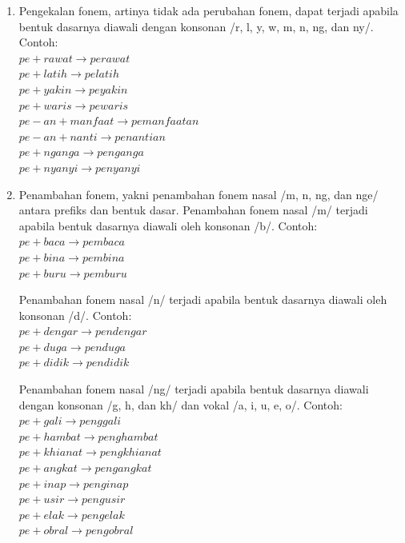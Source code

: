 \begin{enumerate}

	\item Pengekalan fonem, artinya tidak ada perubahan fonem, dapat terjadi apabila bentuk dasarnya diawali dengan konsonan /r, l, y, w, m, n, ng, dan ny/. Contoh:\\
	$pe + rawat \rightarrow perawat$\\	
	$pe + latih \rightarrow pelatih$\\
	$pe + yakin \rightarrow peyakin$\\
	$pe + waris \rightarrow pewaris$\\
	$pe-an + manfaat \rightarrow pemanfaatan$\\
	$pe-an + nanti \rightarrow penantian$\\
	$pe + nganga \rightarrow penganga$\\
	$pe + nyanyi \rightarrow penyanyi$
	
	\item Penambahan fonem, yakni penambahan fonem nasal /m, n, ng, dan nge/ antara prefiks dan bentuk dasar. Penambahan fonem nasal /m/ terjadi apabila bentuk dasarnya diawali oleh konsonan /b/. Contoh:\\
	$pe + baca \rightarrow pembaca$\\
	$pe + bina \rightarrow pembina$\\
	$pe + buru \rightarrow pemburu$
	
	Penambahan fonem nasal /n/ terjadi apabila bentuk dasarnya diawali oleh konsonan /d/. Contoh:\\
	$pe + dengar \rightarrow pendengar$\\
	$pe + duga \rightarrow penduga$\\
	$pe + didik \rightarrow pendidik$
	
	Penambahan fonem nasal /ng/ terjadi apabila bentuk dasarnya diawali dengan konsonan /g, h, dan kh/ dan vokal /a, i, u, e, o/. Contoh:\\
	$pe + gali \rightarrow penggali$\\
	$pe + hambat \rightarrow penghambat$\\
	$pe + khianat \rightarrow pengkhianat$\\
	$pe + angkat \rightarrow pengangkat$\\
	$pe + inap \rightarrow penginap$\\
	$pe + usir \rightarrow pengusir$\\
	$pe + elak \rightarrow pengelak$\\
	$pe + obral \rightarrow pengobral$
	

\end{enumerate}
